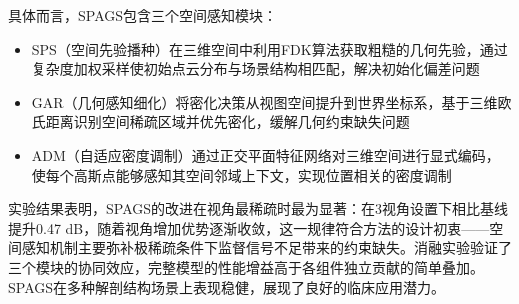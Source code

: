 具体而言，SPAGS包含三个空间感知模块：
\begin{itemize}
    \item SPS（空间先验播种）在三维空间中利用FDK算法获取粗糙的几何先验，通过复杂度加权采样使初始点云分布与场景结构相匹配，解决初始化偏差问题
    \item GAR（几何感知细化）将密化决策从视图空间提升到世界坐标系，基于三维欧氏距离识别空间稀疏区域并优先密化，缓解几何约束缺失问题
    \item ADM（自适应密度调制）通过正交平面特征网络对三维空间进行显式编码，使每个高斯点能够感知其空间邻域上下文，实现位置相关的密度调制
\end{itemize}

实验结果表明，SPAGS的改进在视角最稀疏时最为显著：在3视角设置下相比基线提升0.47 dB，随着视角增加优势逐渐收敛，这一规律符合方法的设计初衷——空间感知机制主要弥补极稀疏条件下监督信号不足带来的约束缺失。消融实验验证了三个模块的协同效应，完整模型的性能增益高于各组件独立贡献的简单叠加。SPAGS在多种解剖结构场景上表现稳健，展现了良好的临床应用潜力。
